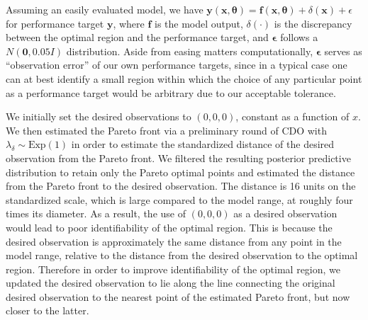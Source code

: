 \documentclass[12pt]{article}
\begin{document}
%
Assuming an easily evaluated model, we have
%
$
\mathbf y(\mathbf x, \boldsymbol\theta) = \mathbf f(\mathbf x,\boldsymbol \theta) + \delta(\mathbf x) + \epsilon
$
%
for performance target $\mathbf y$, where $\mathbf f$ is the model output, $\delta(\cdot)$ is the discrepancy between the optimal region and the performance target, and $\boldsymbol \epsilon$ follows a $N(\mathbf 0,0.05I)$ distribution. 
%
Aside from easing matters computationally, $\boldsymbol \epsilon$ serves as ``observation error'' of our own performance targets, since in a typical case one can at best identify a small region within which the choice of any particular point as a performance target would be arbitrary  due to our acceptable tolerance.
%

We initially set the desired observations to $(0,0,0)$, constant as a function of $x$. 
%
We then estimated the Pareto front via a preliminary round of CDO with $\lambda_\delta\sim \mathrm{Exp}(1)$ in order to estimate the standardized distance of the desired observation from the Pareto front.
%
We filtered the resulting posterior predictive distribution to retain only the Pareto optimal points and estimated the distance from the Pareto front to the desired observation.
%
The distance is 16 units on the standardized scale, which is large compared to the model range, at roughly four times its diameter.
%
As a result, the use of $(0,0,0)$ as a desired observation would lead to poor identifiability of the optimal region. 
%
This is because the desired observation is approximately the same distance from any point in the model range, relative to the distance from the desired observation to the optimal region.
%
%
Therefore in order to improve identifiability of the optimal region, we updated the desired observation to lie along the line connecting the original desired observation to the nearest point of the estimated Pareto front, but now closer to the latter.
\end{document}
